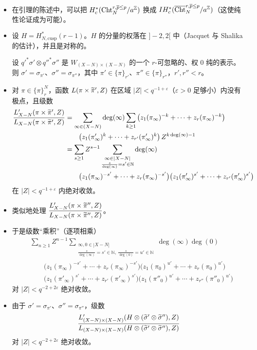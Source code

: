 \begin{itemize}
\item 在引理的陈述中，可以把 $H^*_c(\mathrm{Cht}^{r,\overline{p}\le p}_N/a^{\mathbb{Z}})$ 换成 $IH^*_c(\overline{\mathrm{Cht}}^{r,\overline{p}\le p}_N/a^{\mathbb{Z}})$（这使纯性论证成为可能）。
\item 设 $H = H^*_{N,\mathrm{cusp}}(r-1)$。$H$ 的分量的权落在 $]-2, 2[$ 中（Jacquet 与 Shalika 的估计），并且是对称的。

设 $q'^*\sigma' \otimes q''^*\sigma''$ 是 $W_{(X-N)\times(X-N)}$ 的一个 $r$-可忽略的、权 $0$ 纯的表示。则 $\sigma' = \sigma_{\pi'}$、$\sigma'' = \sigma_{\pi''}$，其中 $\pi' \in \{\pi\}_{r'}$、$\pi'' \in \{\pi\}_{r''}$，$r', r'' < r$。
\item 对 $\pi \in \{\pi\}^N_r$，函数 $L(\pi \times \widetilde{\pi}', Z)$ 在区域 $|Z| < q^{-1+\varepsilon}$（$\varepsilon > 0$ 足够小）内没有极点，且级数
\[
\begin{aligned}
\frac{L'_{X-N}(\pi \times \widetilde{\pi}', Z)}{L_{X-N}(\pi \times \widetilde{\pi}', Z)}
&= \sum_{\infty \in (X-N)} \deg(\infty) \sum_{k \ge 1} \big(z_1(\pi_\infty)^{-k} + \cdots + z_r(\pi_\infty)^{-k}\big)\\
&\qquad \big(z_1(\pi'_\infty)^k + \cdots + z_{r'}(\pi'_\infty)^k\big)\, Z^{k\deg(\infty)-1}\\
&= \sum_{s \ge 1} Z^{s-1} \sum_{\substack{\infty \in |X-N|\\ \frac{s}{\deg(\infty)} = s' \in \mathbb{N}}} \deg(\infty)\\
&\qquad \big(z_1(\pi_\infty)^{-s'} + \cdots + z_r(\pi_\infty)^{-s'}\big)\big(z_1(\pi'_\infty)^{s'} + \cdots + z_{r'}(\pi'_\infty)^{s'}\big)
\end{aligned}
\]
在 $|Z| < q^{-1+\varepsilon}$ 内绝对收敛。
\item 类似地处理 $\dfrac{L'_{X-N}(\pi \times \widetilde{\pi}'', Z)}{L_{X-N}(\pi \times \widetilde{\pi}'', Z)}$。
\item 于是级数“乘积”（逐项相乘）
\[
\begin{aligned}
&\sum_{n \ge 1} Z^{n-1} \sum_{\substack{\infty, 0 \in |X-N|\\ \frac{s}{\deg(\infty)} = s' \in \mathbb{N},\ \frac{s}{\deg(0)} = u' \in \mathbb{N}}} \deg(\infty)\deg(0)\\
&\qquad \big(z_1(\pi_\infty)^{-s'} + \cdots + z_r(\pi_\infty)^{-s'}\big)\big(z_1(\pi_0)^{u'} + \cdots + z_r(\pi_0)^{u'}\big)\\
&\qquad \big(z_1(\pi'_\infty)^{s'} + \cdots + z_{r'}(\pi'_\infty)^{s'}\big)\big(z_1(\pi''_0)^{u'} + \cdots + z_{r''}(\pi''_0)^{u'}\big)
\end{aligned}
\]
对 $|Z| < q^{-2+2\varepsilon}$ 绝对收敛。
\item 由于 $\sigma' = \sigma_{\pi'}$、$\sigma'' = \sigma_{\pi''}$，级数
\[ \frac{L'_{(X-N)\times(X-N)}(H \otimes (\widetilde{\sigma}' \otimes \widetilde{\sigma}''), Z)}{L_{(X-N)\times(X-N)}(H \otimes (\widetilde{\sigma}' \otimes \widetilde{\sigma}''), Z)} \]
对 $|Z| < q^{-2+2\varepsilon}$ 绝对收敛。
\end{itemize}


